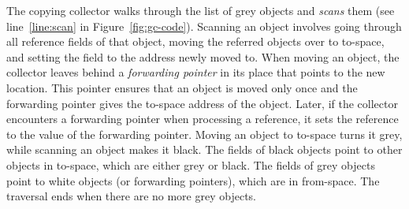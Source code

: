 The copying
collector walks through the list of grey objects and {\em scans} them (see
line~\ref{line:scan} in Figure~\ref{fig:gc-code}). Scanning an object
involves going through all reference fields of that object, moving the
referred objects over to to-space, and setting the field to the address
newly moved to. When moving an object, the collector leaves behind a {\em
forwarding pointer} in its place that points to the new location. This pointer
ensures that an object is moved only once and the forwarding pointer gives the
to-space address 
of the object. Later, if the collector encounters a
forwarding pointer when processing a reference, it sets the reference to
the value of the forwarding pointer.
Moving an object to to-space turns it
grey, while scanning an object makes it black. The fields of black objects
point to other objects in to-space, which are either grey or black.  The
fields of grey objects point to white objects (or forwarding pointers),
which are in from-space.
The traversal ends when there are no more grey
objects.



